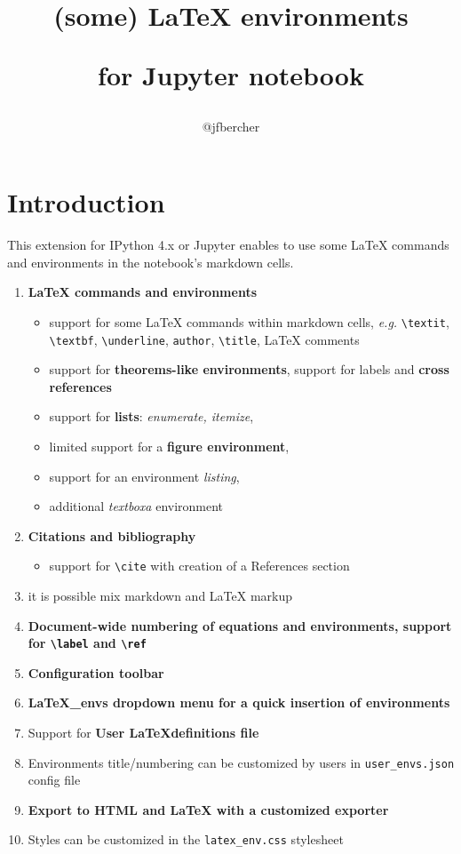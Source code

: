 
    
    
    
    


    


    
    \title{(some) LaTeX environments \par for Jupyter notebook}\author{@jfbercher}

    \section{Introduction}\label{introduction}

    This extension for IPython 4.x or Jupyter enables to use some LaTeX
commands and environments in the notebook's markdown cells.
\begin{enumerate} \item \textbf{LaTeX commands and environments}
\begin{itemize} \item support for some LaTeX commands within
markdown cells, \emph{e.g.} \texttt{\textbackslash{}textit},
\texttt{\textbackslash{}textbf}, \texttt{\textbackslash{}underline},
\texttt{author}, \texttt{\textbackslash{}title}, LaTeX comments \item
support for \textbf{theorems-like environments}, support for labels and
\textbf{cross references} \item support for \textbf{lists}:
\emph{enumerate, itemize},\\
\item limited support for a \textbf{figure environment}, \item support
for an environment \emph{listing}, \item additional \emph{textboxa}
environment \end{itemize} \item \textbf{Citations and
bibliography} \begin{itemize} \item support for
\texttt{\textbackslash{}cite} with creation of a References section
\end{itemize} \item it is possible mix markdown and LaTeX
markup \item \textbf{Document-wide numbering of equations and
environments, support for \texttt{\textbackslash{}label} and
\texttt{\textbackslash{}ref}} \item \textbf{Configuration toolbar} \item
\textbf{LaTeX\_envs dropdown menu for a quick insertion of environments}
\item Support for \textbf{User \LaTeX definitions file} \item
Environments title/numbering can be customized by users in
\texttt{user\_envs.json} config file \item \textbf{Export to HTML and
LaTeX with a customized exporter} \item Styles can be customized in the
\texttt{latex\_env.css} stylesheet \end{enumerate}

